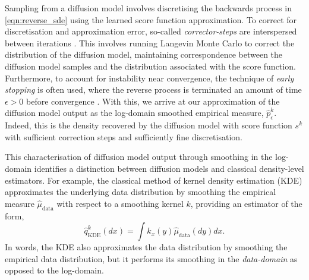 \documentclass[10pt]{article}
\theoremstyle{plain}
\theoremstyle{definition}
\theoremstyle{remark}
\newcommand{\hmud}{\hat{\mu}_{\operatorname{data}}}
\begin{document}
Sampling from a diffusion model involves discretising the backwards process in \eqref{eqn:reverse_sde} using the learned score function approximation. To correct for discretisation and approximation error, so-called \emph{corrector-steps} are interspersed between iterations \citep{song2021scorebased, karras22_edm}. This involves running Langevin Monte Carlo to correct the distribution of the diffusion model, maintaining correspondence between the diffusion model samples and the distribution associated with the score function. Furthermore, to account for instability near convergence, the technique of \emph{early stopping} is often used, where the reverse process is terminated an amount of time \(\epsilon > 0\) before convergence \citep{song2021scorebased}. With this, we arrive at our approximation of the diffusion model output as the log-domain smoothed empirical measure, \(\hat{p}_\epsilon^k\). Indeed, this is the density recovered by the diffusion model with score function \(s^k\) with sufficient correction steps and sufficiently fine discretisation.

This characterisation of diffusion model output through smoothing in the log-domain identifies a distinction between diffusion models and classical density-level estimators. For example, the classical method of kernel density estimation (KDE) \citep{tsybakov2009nonparametric} approximates the underlying data distribution by smoothing the empirical measure \(\hmud\) with respect to a smoothing kernel \(k\), providing an estimator of the form,
\begin{equation*}
    \hat{q}^k_{\text{KDE}}(dx) = \int k_x(y) \hmud(dy) dx.
\end{equation*}
In words, the KDE also approximates the data distribution by smoothing the empirical data distribution, but it performs its smoothing in the \emph{data-domain} as opposed to the log-domain.
\end{document}
